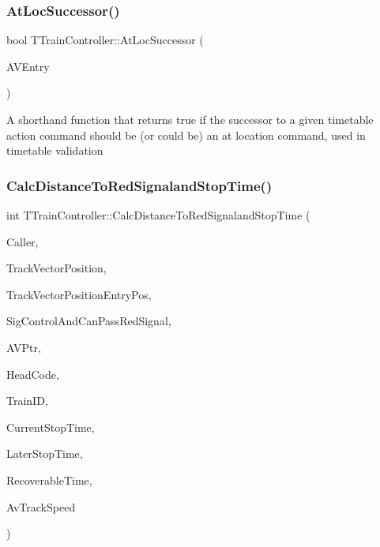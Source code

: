 \subsubsection{\texorpdfstring{At\+Loc\+Successor()}{AtLocSuccessor()}}
{\footnotesize\ttfamily bool T\+Train\+Controller\+::\+At\+Loc\+Successor (\begin{DoxyParamCaption}\item[{const \mbox{\hyperlink{class_t_action_vector_entry}{T\+Action\+Vector\+Entry}} \&}]{A\+V\+Entry }\end{DoxyParamCaption})}

A shorthand function that returns true if the successor to a given timetable action command should be (or could be) an \textquotesingle{}at location\textquotesingle{} command, used in timetable validation \mbox{\label{class_t_train_controller_ad81afe17a036ab3f96c340ab75a2d8e2}} 
\subsubsection{\texorpdfstring{Calc\+Distance\+To\+Red\+Signaland\+Stop\+Time()}{CalcDistanceToRedSignalandStopTime()}}
{\footnotesize\ttfamily int T\+Train\+Controller\+::\+Calc\+Distance\+To\+Red\+Signaland\+Stop\+Time (\begin{DoxyParamCaption}\item[{int}]{Caller,  }\item[{int}]{Track\+Vector\+Position,  }\item[{int}]{Track\+Vector\+Position\+Entry\+Pos,  }\item[{bool}]{Sig\+Control\+And\+Can\+Pass\+Red\+Signal,  }\item[{\mbox{\hyperlink{class_t_action_vector_entry}{T\+Action\+Vector\+Entry}} $\ast$}]{A\+V\+Ptr,  }\item[{Ansi\+String}]{Head\+Code,  }\item[{int}]{Train\+ID,  }\item[{float \&}]{Current\+Stop\+Time,  }\item[{float \&}]{Later\+Stop\+Time,  }\item[{float \&}]{Recoverable\+Time,  }\item[{int \&}]{Av\+Track\+Speed }\end{DoxyParamCaption})}


